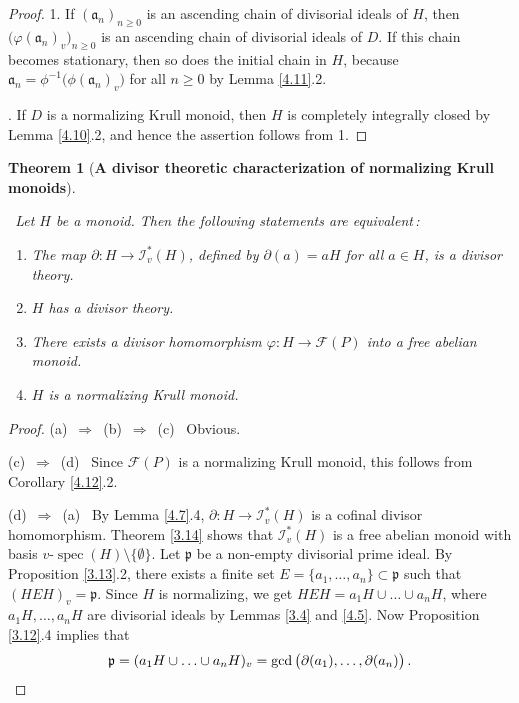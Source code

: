 \documentclass[a4paper]{amsart}
\newtheorem{theorem}{Theorem}[section]
\theoremstyle{definition}
\numberwithin{equation}{section}
\begin{document}
\begin{proof}
1. If $(\mathfrak a_n)_{n \ge 0}$ is an ascending chain of
divisorial ideals of $H$, then $\big( \varphi (\mathfrak a_n)_v
\big)_{n \ge 0}$ is an ascending chain of divisorial ideals of $D$.
If this chain becomes stationary, then so does the initial chain in
$H$, because $\mathfrak a_n = \phi^{-1} \big( \phi (\mathfrak a_n)_v
\big)$ for all $n \ge 0$ by Lemma \ref{4.11}.2.

. If $D$ is a normalizing Krull monoid, then $H$ is completely
integrally closed by Lemma \ref{4.10}.2, and hence the assertion
follows from 1.
\end{proof}

\medskip
\begin{theorem}[\bf A divisor theoretic characterization of normalizing Krull monoids]
\label{4.13}~

\noindent \ Let $H$ be a  monoid. Then the following statements are
equivalent{\rm \,:}
\begin{enumerate}
\item[(a)] The map $\partial \colon H \to \mathcal I_v^* (H)$, defined by
      $\partial (a) = aH$ for all $a \in H$, is a divisor theory.

\smallskip
\item[(b)] $H$ has a divisor theory.

\smallskip
\item[(c)] There exists a divisor homomorphism $\varphi \colon H \to
           \mathcal F (P)$ into a free abelian monoid.

\smallskip
\item[(d)] $H$ is a normalizing Krull monoid.

\end{enumerate}
\end{theorem}

\begin{proof}
(a) \,$\Rightarrow$\, (b) \,$\Rightarrow$\, (c) \ Obvious.

\smallskip
(c) \,$\Rightarrow$\, (d) \ Since $\mathcal F (P)$ is a normalizing
Krull monoid, this follows from Corollary \ref{4.12}.2.

\smallskip
(d) \,$\Rightarrow$\, (a) \ By Lemma \ref{4.7}.4, $\partial \colon H
\to \mathcal I_v^* (H)$ is a cofinal divisor
      homomorphism. Theorem \ref{3.14}
shows that  $\mathcal I_v^* (H)$ is a free abelian monoid with basis
$v$-$\operatorname{spec} (H) \setminus \{\emptyset\}$. Let $\mathfrak p$ be a
non-empty divisorial prime ideal. By Proposition \ref{3.13}.2, there
exists a finite set $E = \{a_1, \ldots, a_n \} \subset \mathfrak p$
such that $(HEH)_v = \mathfrak p$. Since $H$ is normalizing, we get
$HEH = a_1H \cup \ldots \cup a_nH$, where $a_1H, \ldots, a_nH$ are
divisorial ideals by Lemmas \ref{3.4} and \ref{4.5}. Now Proposition
\ref{3.12}.4 implies that
\[
\mathfrak p = (a_1H \cup \ldots \cup a_nH)_v = \gcd \big( \partial
(a_1), \ldots, \partial (a_n) \big) \,. \qedhere
\]
\end{proof}
\end{document}
